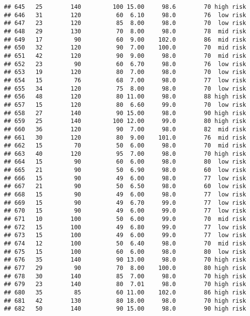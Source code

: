\documentclass[
  ignorenonframetext,
]{beamer}
\begin{document}
\begin{frame}[fragile]
\begin{verbatim}
## 645   25        140         100 15.00     98.6        70 high risk
## 646   31        120          60  6.10     98.0        76  low risk
## 647   23        120          85  8.00     98.0        70  low risk
## 648   29        130          70  8.00     98.0        78  mid risk
## 649   17         90          60  9.00    102.0        86  mid risk
## 650   32        120          90  7.00    100.0        70  mid risk
## 651   42        120          90  9.00     98.0        70  mid risk
## 652   23         90          60  6.70     98.0        76  low risk
## 653   19        120          80  7.00     98.0        70  low risk
## 654   15         76          68  7.00     98.0        77  low risk
## 655   34        120          75  8.00     98.0        70  low risk
## 656   48        120          80 11.00     98.0        88 high risk
## 657   15        120          80  6.60     99.0        70  low risk
## 658   27        140          90 15.00     98.0        90 high risk
## 659   25        140         100 12.00     99.0        80 high risk
## 660   36        120          90  7.00     98.0        82  mid risk
## 661   30        120          80  9.00    101.0        76  mid risk
## 662   15         70          50  6.00     98.0        70  mid risk
## 663   40        120          95  7.00     98.0        70 high risk
## 664   15         90          60  6.00     98.0        80  low risk
## 665   21         90          50  6.90     98.0        60  low risk
## 666   15         90          49  6.00     98.0        77  low risk
## 667   21         90          50  6.50     98.0        60  low risk
## 668   15         90          49  6.00     98.0        77  low risk
## 669   15         90          49  6.70     99.0        77  low risk
## 670   15         90          49  6.00     99.0        77  low risk
## 671   10        100          50  6.00     99.0        70  mid risk
## 672   15        100          49  6.80     99.0        77  low risk
## 673   15        100          49  6.00     99.0        77  low risk
## 674   12        100          50  6.40     98.0        70  mid risk
## 675   15        100          60  6.00     98.0        80  low risk
## 676   35        140          90 13.00     98.0        70 high risk
## 677   29         90          70  8.00    100.0        80 high risk
## 678   30        140          85  7.00     98.0        70 high risk
## 679   23        140          80  7.01     98.0        70 high risk
## 680   35         85          60 11.00    102.0        86 high risk
## 681   42        130          80 18.00     98.0        70 high risk
## 682   50        140          90 15.00     98.0        90 high risk

\end{verbatim}
\end{frame}
\end{document}
